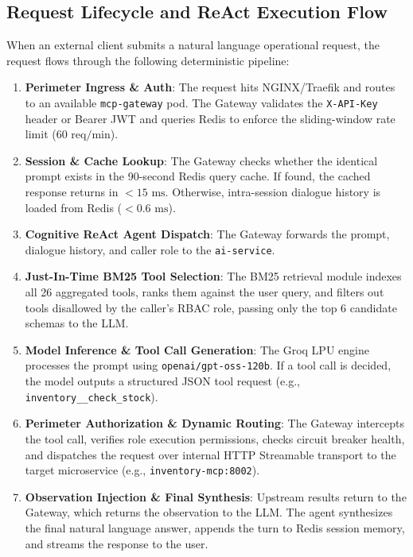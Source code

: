 \documentclass[11pt,a4paper]{article}
\begin{document}
\subsection{Request Lifecycle and ReAct Execution Flow}
When an external client submits a natural language operational request, the request flows through the following deterministic pipeline:
\begin{enumerate}[leftmargin=*]
    \item \textbf{Perimeter Ingress \& Auth}: The request hits NGINX/Traefik and routes to an available \texttt{mcp-gateway} pod. The Gateway validates the \texttt{X-API-Key} header or Bearer JWT and queries Redis to enforce the sliding-window rate limit ($60 \text{ req/min}$).
    \item \textbf{Session \& Cache Lookup}: The Gateway checks whether the identical prompt exists in the 90-second Redis query cache. If found, the cached response returns in $<15\text{ ms}$. Otherwise, intra-session dialogue history is loaded from Redis ($<0.6\text{ ms}$).
    \item \textbf{Cognitive ReAct Agent Dispatch}: The Gateway forwards the prompt, dialogue history, and caller role to the \texttt{ai-service}.
    \item \textbf{Just-In-Time BM25 Tool Selection}: The BM25 retrieval module indexes all 26 aggregated tools, ranks them against the user query, and filters out tools disallowed by the caller's RBAC role, passing only the top 6 candidate schemas to the LLM.
    \item \textbf{Model Inference \& Tool Call Generation}: The Groq LPU engine processes the prompt using \texttt{openai/gpt-oss-120b}. If a tool call is decided, the model outputs a structured JSON tool request (e.g., \texttt{inventory\_\_check\_stock}).
    \item \textbf{Perimeter Authorization \& Dynamic Routing}: The Gateway intercepts the tool call, verifies role execution permissions, checks circuit breaker health, and dispatches the request over internal HTTP Streamable transport to the target microservice (e.g., \texttt{inventory-mcp:8002}).
    \item \textbf{Observation Injection \& Final Synthesis}: Upstream results return to the Gateway, which returns the observation to the LLM. The agent synthesizes the final natural language answer, appends the turn to Redis session memory, and streams the response to the user.
\end{enumerate}

\end{document}
